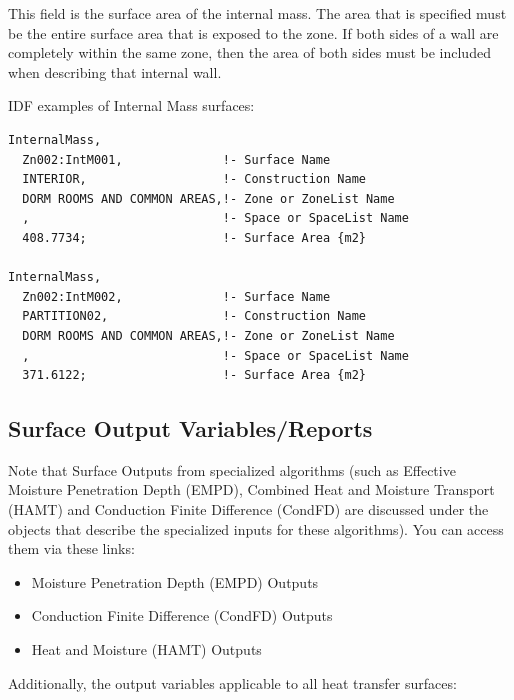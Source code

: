 This field is the surface area of the internal mass. The area that is specified must be the entire surface area that is exposed to the zone. If both sides of a wall are completely within the same zone, then the area of both sides must be included when describing that internal wall.

IDF examples of Internal Mass surfaces:

\begin{lstlisting}
InternalMass,
  Zn002:IntM001,              !- Surface Name
  INTERIOR,                   !- Construction Name
  DORM ROOMS AND COMMON AREAS,!- Zone or ZoneList Name
  ,                           !- Space or SpaceList Name
  408.7734;                   !- Surface Area {m2}

InternalMass,
  Zn002:IntM002,              !- Surface Name
  PARTITION02,                !- Construction Name
  DORM ROOMS AND COMMON AREAS,!- Zone or ZoneList Name
  ,                           !- Space or SpaceList Name
  371.6122;                   !- Surface Area {m2}
\end{lstlisting}

\subsection{Surface Output Variables/Reports}\label{surface-output-variablesreports}

Note that Surface Outputs from specialized algorithms (such as Effective Moisture Penetration Depth (EMPD), Combined Heat and Moisture Transport (HAMT) and Conduction Finite Difference (CondFD) are discussed under the objects that describe the specialized inputs for these algorithms). You can access them via these links:

\begin{itemize}
\tightlist
\item
  Moisture Penetration Depth (EMPD) Outputs
\item
  Conduction Finite Difference (CondFD) Outputs
\item
  Heat and Moisture (HAMT) Outputs
\end{itemize}

Additionally, the output variables applicable to all heat transfer surfaces:

